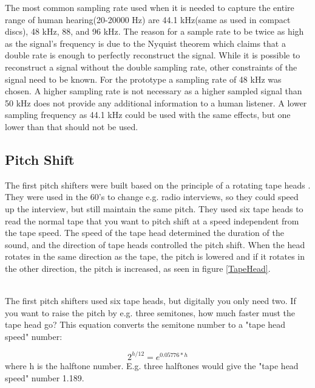 The most common sampling rate used when it is needed to capture the entire range of human hearing(20-20000 Hz) are 44.1 kHz(same as used in compact discs), 48 kHz, 88, and 96 kHz. The reason for a sample rate to be twice as high as the signal’s frequency is due to the Nyquist theorem which claims that a double rate is enough to perfectly reconstruct the signal. While it is possible to reconstruct a signal without the double sampling rate, other constraints of the signal need to be known. For the prototype a sampling rate of 48 kHz was chosen. A higher sampling rate is not necessary as a higher sampled signal than 50 kHz does not provide any additional information to a human listener. A lower sampling frequency as 44.1 kHz could be used with the same effects, but one lower than that should not be used.

\subsection{Pitch Shift}

The first pitch shifters were built based on the principle of a rotating tape heads \citep{Katjaas_00}. They were used in the 60's to change e.g. radio interviews, so they could speed up the interview, but still maintain the same pitch. They used six tape heads to read the normal tape that you want to pitch shift at a speed independent from the tape speed. The speed of the tape head determined the duration of the sound, and the direction of tape heads controlled the pitch shift. When the head rotates in the same direction as the tape, the pitch is lowered and if it rotates in the other direction, the pitch is increased, as seen in figure \ref{TapeHead}. \\

\begin{minipage}{\linewidth}%
\label{TapeHead}
\end{minipage}\\

The first pitch shifters used six tape heads, but digitally you only need two. If you want to raise the pitch by e.g. three semitones, how much faster must the tape head go?
This equation converts the semitone number to a "tape head speed" number:

\[ 2^{h/12} = e^{0.05776*h} \] where h is the halftone number. E.g. three halftones would give the "tape head speed" number 1.189. \\

